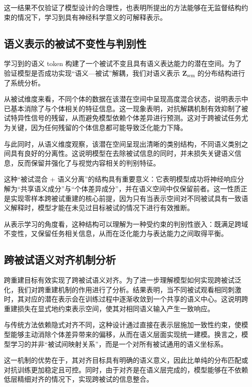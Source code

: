 这一结果不仅验证了模型设计的合理性，也表明所提出的方法能够在无监督结构约束的情况下，学习到具有神经科学意义的可解释表示。

\subsection{语义表示的被试不变性与判别性}

学习到的语义 token 构建了一个被试不变且具有语义表达能力的潜在空间。为了验证模型是否成功实现“语义—被试”解耦，我们对语义表示 $\mathbf{Z}_{\mathrm{sem}}$ 的分布结构进行了系统分析。

从被试维度来看，不同个体的数据在该潜在空间中呈现高度混合状态，说明表示中已基本消除了与个体相关的特征信息。这一现象表明，对抗解耦机制有效抑制了被试特异性信号的残留，从而避免模型依赖个体差异进行预测。这对于跨被试任务尤为关键，因为任何残留的个体信息都可能导致泛化能力下降。

与此同时，从语义维度观察，该潜在空间呈现出清晰的类别结构，不同语义类别之间具有良好的分离性。这说明模型在去除被试信息的同时，并未损失关键语义信息，反而保留并强化了与视觉内容相关的判别特征。

这种“被试混合 + 语义分离”的结构具有重要意义：它表明模型成功将神经响应分解为“共享语义成分”与“个体差异成分”，并在语义空间中仅保留前者。这一性质正是实现零样本跨被试重建的核心前提，因为只有当表示空间对不同被试具有一致语义解释时，模型才能在未见过目标被试的情况下进行有效推断。

从表示学习的角度看，这种结构可以理解为一种受约束的判别性嵌入：既满足跨域不变性，又保留任务相关信息，从而在泛化能力与表达能力之间取得平衡。

\subsection{跨被试语义对齐机制分析}

跨重建目标有效实现了跨被试语义对齐。为了进一步理解模型如何实现跨被试泛化，我们对跨重建机制的作用进行了分析。结果表明，当不同被试观看相同刺激时，其对应的潜在表示会在训练过程中逐渐收敛到一个共享的语义中心。这说明跨重建损失在显式地约束表示空间，使其对相同语义输入产生一致响应。

与传统方法依赖隐式对齐不同，这种设计通过直接在表示层施加一致性约束，使模型能够主动消除个体差异带来的偏移，从而在语义层面实现统一建模。换言之，模型学习的并非“被试间映射关系”，而是一个对所有被试通用的语义坐标系。

这一机制的优势在于，其对齐目标具有明确的语义意义，因此比单纯的分布匹配或对抗训练更加稳定且可控。同时，由于对齐是在语义层完成的，模型能够在不依赖低层精细对齐的情况下，实现跨被试的信息整合。

